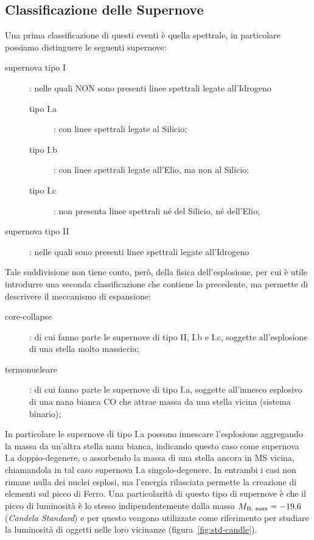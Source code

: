 \subsection{Classificazione delle Supernove} \label{sec:calss-supernove}

Una prima classificazione di questi eventi è quella spettrale, in particolare possiamo distinguere le seguenti supernove:
\begin{description}
    \item[supernova tipo I]: nelle quali NON sono presenti linee spettrali legate all'Idrogeno
    \begin{description}
        \item[tipo I.a]: con linee spettrali legate al Silicio;
        \item[tipo I.b]: con linee spettrali legate all'Elio, ma non al Silicio;
        \item[tipo I.c]: non presenta linee spettrali né del Silicio, né dell'Elio;
    \end{description}
    \item[supernova tipo II]: nelle quali sono presenti linee spettrali legate all'Idrogeno
\end{description}

Tale suddivisione non tiene conto, però, della fisica dell'esplosione, per cui è utile introdurre una seconda classificazione che contiene la precedente, ma permette di descrivere il meccanismo di espansione:
\begin{description}
    \item[core-collapse]: di cui fanno parte le supernove di tipo II, I.b e I.c, soggette all'esplosione di una stella molto massiccia;
    \item[termonucleare]: di cui fanno parte le supernove di tipo I.a, soggette all'innesco esplosivo di una nana bianca CO che attrae massa da una stella vicina (sistema binario);
\end{description}

In particolare le supernove di tipo I.a possono innescare l'esplosione aggregando la massa da un'altra stella nana bianca, indicando questo caso come supernova I.a doppio-degenere, o assorbendo la massa di una stella ancora in MS vicina, chiamandola in tal caso supernova I.a singolo-degenere. In entrambi i casi non rimane nulla dei nuclei esplosi, ma l'energia rilasciata permette la creazione di elementi sul picco di Ferro. Una particolarità di questo tipo di supernove è che il picco di luminosità è lo stesso indipendentemente dalla massa $M_{\mbox{\scriptsize{B, max}}} = - 19.6$ (\textit{Candela Standard}) e per questo vengono utilizzate come riferimento per studiare la luminosità di oggetti nelle loro vicinanze (figura~\ref{fig:std-candle}).

